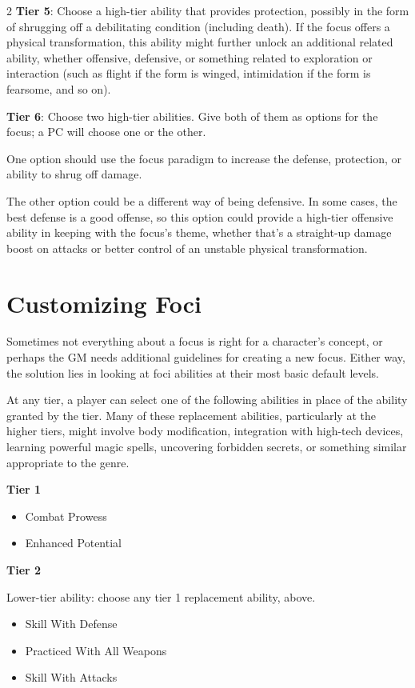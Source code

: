 \begin{multicols}{2}
\textbf{Tier 5}: Choose a high-tier ability that provides protection, possibly in the form of shrugging off a debilitating condition (including death). If the focus offers a physical transformation, this ability might further unlock an additional related ability, whether offensive, defensive, or something related to exploration or interaction (such as flight if the form is winged, intimidation if the form is fearsome, and so on).

\textbf{Tier 6}: Choose two high-tier abilities. Give both of them as options for the focus; a PC will choose one or the other.

One option should use the focus paradigm to increase the defense, protection, or ability to shrug off damage. 

The other option could be a different way of being defensive. In some cases, the best defense is a good offense, so this option could provide a high-tier offensive ability in keeping with the focus’s theme, whether that’s a straight-up damage boost on attacks or better control of an unstable physical transformation.


\section{Customizing Foci}

Sometimes not everything about a focus is right for a character’s concept, or perhaps the GM needs additional guidelines for creating a new focus. Either way, the solution lies in looking at foci abilities at their most basic default levels.

At any tier, a player can select one of the following abilities in place of the ability granted by the tier. Many of these replacement abilities, particularly at the higher tiers, might involve body modification, integration with high-tech
devices, learning powerful magic spells, uncovering forbidden secrets, or something similar appropriate to the genre.

\textbf{Tier 1}

\begin{itemize} 
\item Combat Prowess
\item Enhanced Potential
\end{itemize}

\textbf{Tier 2}

Lower-tier ability: choose any tier 1 replacement ability, above.
\begin{itemize}
\item Skill With Defense
\item Practiced With All Weapons
\item Skill With Attacks
\end{itemize}


\end{multicols}
